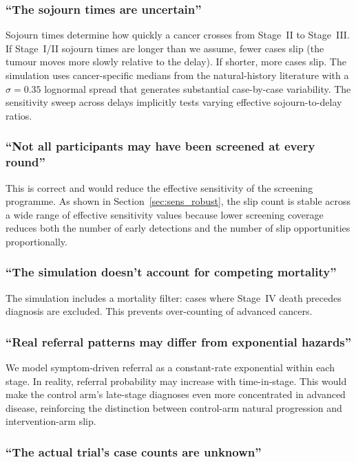 \documentclass[11pt,letter]{article}
\begin{document}
\subsubsection{``The sojourn times are uncertain''}

Sojourn times determine how quickly a cancer crosses from Stage~II to
Stage~III. If Stage~I/II sojourn times are longer than we assume, fewer
cases slip (the tumour moves more slowly relative to the delay). If
shorter, more cases slip. The simulation uses cancer-specific medians from
the natural-history literature with a $\sigma = 0.35$ lognormal spread
that generates substantial case-by-case variability. The sensitivity sweep
across delays implicitly tests varying effective sojourn-to-delay ratios.

\subsubsection{``Not all participants may have been screened at every round''}

This is correct and would reduce the effective sensitivity of the screening
programme. As shown in Section~\ref{sec:sens_robust}, the slip count is
stable across a wide range of effective sensitivity values because lower
screening coverage reduces both the number of early detections and the
number of slip opportunities proportionally.

\subsubsection{``The simulation doesn't account for competing mortality''}

The simulation includes a mortality filter: cases where Stage~IV death
precedes diagnosis are excluded. This prevents over-counting of advanced
cancers.

\subsubsection{``Real referral patterns may differ from exponential
hazards''}

We model symptom-driven referral as a constant-rate exponential within each
stage. In reality, referral probability may increase with time-in-stage.
This would make the control arm's late-stage diagnoses even more
concentrated in advanced disease, reinforcing the distinction between
control-arm natural progression and intervention-arm slip.

\subsubsection{``The actual trial's case counts are unknown''}
\end{document}
